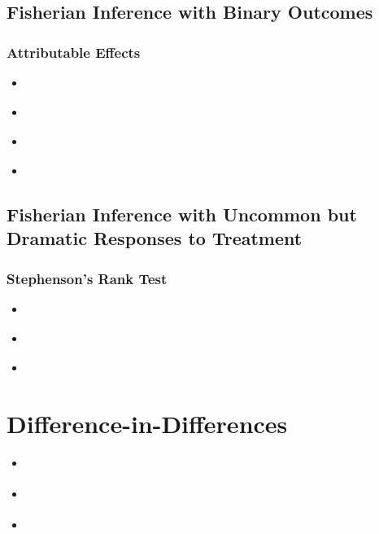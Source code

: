 \documentclass[12pt,leqno]{article}
\theoremstyle{newstyle}
\begin{document}
\subsection{Fisherian Inference with Binary Outcomes}

\subsubsection{Attributable Effects}

\begin{itemize}

\item \citet[Section 5.5]{rosenbaum2002observational}

\item \citet[Section 2.5]{rosenbaum2010}

\item \citet{rosenbaum2001}

\item \citet{hansenbowers2009}

\end{itemize}

\subsection{Fisherian Inference with Uncommon but Dramatic Responses to Treatment}

\subsubsection{Stephenson's Rank Test}

\begin{itemize}

\item \citet{stephenson1981}

\item \citet[Chapter 16]{rosenbaum2010}

\item \citet{rosenbaum2007b}

\end{itemize}

\section{Difference-in-Differences}

\begin{itemize}

\item \citet[Section 4.1]{gerbergreen2012}

\item \citet[Section 5.2]{angristpischke2008}

\item \citet[Chapter 5]{angristpischke2014}

\end{itemize}
\end{document}
